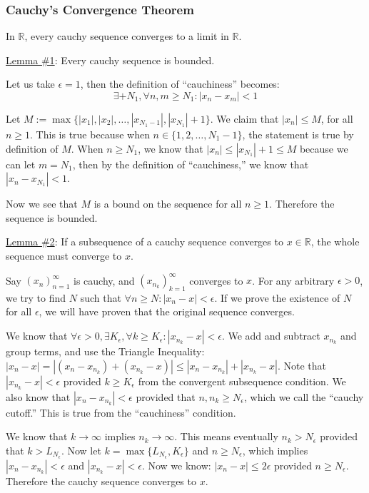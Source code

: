 \subsubsection{Cauchy's Convergence Theorem}

In $\mathbb{R}$, every cauchy sequence converges to a limit in $\mathbb{R}$.
\par \underline{Lemma \#1}: Every cauchy sequence is bounded.

Let us take $\epsilon = 1$, then the definition of ``cauchiness'' becomes:
$$\exists+ N_1, \forall n, m \geq N_1 : |x_n - x_m| < 1$$

Let $M := \max\{|x_1|, |x_2|, \dots, |x_{N_1 - 1}|, |x_{N_1}| + 1\}$. We claim
that $|x_n| \leq M$, for all $n \geq 1$. This is true because when $n \in \{1, 2, \dots, N_1
- 1\}$, the statement is true by definition of $M$. When $n \geq N_1$, we know
that $|x_n| \leq |x_{N_1}| + 1 \leq M$ because we can let $m = N_1$, then by the
definition of ``cauchiness,'' we know that $|x_n - x_{N_1}| < 1$.

Now we see that $M$ is a bound on the sequence for all $n \geq 1$. Therefore the
sequence is bounded.

\underline{Lemma \#2}: If a subsequence of a cauchy sequence converges to $x \in \mathbb{R}$, the
whole sequence must converge to $x$.

Say $(x_n)_{n=1}^\infty$ is cauchy, and $(x_{n_k})_{k = 1}^\infty$ converges to
$x$. For any arbitrary $\epsilon > 0$, we try to find $N$ such that $\forall
n \geq N: |x_n - x| < \epsilon$. If we prove the existence of $N$ for all
$\epsilon$, we will have proven that the original sequence converges.

We know that $\forall \epsilon > 0, \exists K_\epsilon, \forall k \geq
K_\epsilon: |x_{n_k} - x| < \epsilon$. We add and subtract $x_{n_k}$ and
group terms, and use the Triangle Inequality: $|x_n - x| = |(x_n - x_{n_k}) + (x_{n_k} - x)| \leq
|x_n - x_{n_k}| + |x_{n_k} - x|$. Note that $|x_{n_k} - x| < \epsilon$
provided $k \geq K_{\epsilon}$ from the convergent subsequence condition. We
also know that $|x_n - x_{n_k}| < \epsilon$ provided that $n, n_k \geq
N_{\epsilon}$, which we call the ``cauchy cutoff.'' This is true from the
``cauchiness'' condition.

We know that $k\to\infty$ implies $n_k \to \infty$. This means eventually
$n_k > N_\epsilon$ provided that $k > L_{N_\epsilon}$. Now let $k =
\max\{L_{N_\epsilon}, K_\epsilon\}$ and $n \geq N_\epsilon$, which
implies $|x_n - x_{n_k}| < \epsilon$ and $|x_{n_k} - x| < \epsilon$.
Now we know: $|x_n - x| \leq 2\epsilon$ provided $n \geq N_{\epsilon}$.
Therefore the cauchy sequence converges to $x$.


